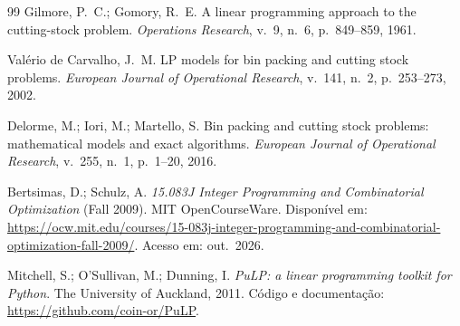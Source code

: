 \begin{thebibliography}{99}
Gilmore, P.~C.; Gomory, R.~E. A linear programming approach to the cutting-stock problem. \emph{Operations
Research}, v.~9, n.~6, p.~849--859, 1961.

Valério de Carvalho, J.~M. LP models for bin packing and cutting stock problems. \emph{European Journal of
Operational Research}, v.~141, n.~2, p.~253--273, 2002.

Delorme, M.; Iori, M.; Martello, S. Bin packing and cutting stock problems: mathematical models and exact
algorithms. \emph{European Journal of Operational Research}, v.~255, n.~1, p.~1--20, 2016.

Bertsimas, D.; Schulz, A. \emph{15.083J Integer Programming and Combinatorial Optimization} (Fall 2009). MIT
OpenCourseWare. Disponível em:
\url{https://ocw.mit.edu/courses/15-083j-integer-programming-and-combinatorial-optimization-fall-2009/}. Acesso em:
out.\ 2026.

Mitchell, S.; O'Sullivan, M.; Dunning, I. \emph{PuLP: a linear programming toolkit for Python}. The University of
Auckland, 2011. Código e documentação: \url{https://github.com/coin-or/PuLP}.

\end{thebibliography}
